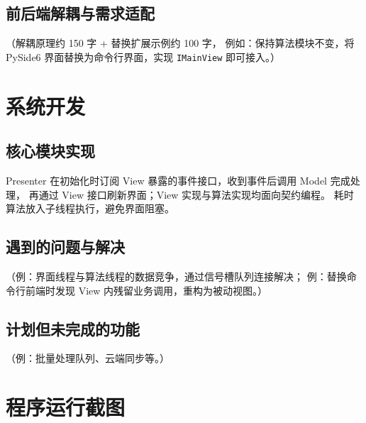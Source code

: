 \documentclass[12pt,a4paper]{ctexart}
\begin{document}
\subsection{前后端解耦与需求适配}\label{subsec:decouple}

（解耦原理约 150 字 + 替换扩展示例约 100 字，
例如：保持算法模块不变，将 PySide6 界面替换为命令行界面，实现 \texttt{IMainView} 即可接入。）

\section{系统开发}\label{sec:dev}

\subsection{核心模块实现}

Presenter 在初始化时订阅 View 暴露的事件接口，收到事件后调用 Model 完成处理，
再通过 View 接口刷新界面；View 实现与算法实现均面向契约编程。
耗时算法放入子线程执行，避免界面阻塞。

\subsection{遇到的问题与解决}

（例：界面线程与算法线程的数据竞争，通过信号槽队列连接解决；
例：替换命令行前端时发现 View 内残留业务调用，重构为被动视图。）

\subsection{计划但未完成的功能}

（例：批量处理队列、云端同步等。）

\section{程序运行截图}\label{sec:screenshots}
\end{document}
